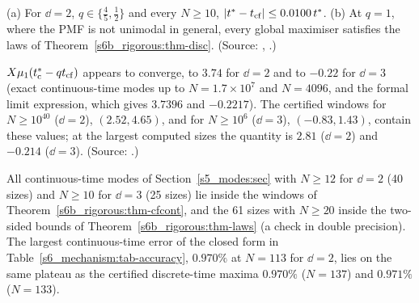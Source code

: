 \begin{conjecture}\label{s6b_rigorous:conj-cf}
(a) For $\dd=2$, $q\in\{\frac45,\frac12\}$ and every $N\ge10$, $|t^{*}-t_{\mathrm{cf}}|\le0.0100\,t^{*}$. (b) At $q=1$,
where the PMF is not unimodal in general, every global maximiser satisfies the laws of
Theorem~\ref{s6b_rigorous:thm-disc}.
\textup{(Source: , .)}
\end{conjecture}

\begin{observation}\label{s6b_rigorous:obs-Kinf}
$X\mu_{1}(t^{*}_{\mathrm{c}}-qt_{\mathrm{cf}})$ appears to converge, to $3.74$ for $\dd=2$ and to $-0.22$ for $\dd=3$ (exact continuous-time
modes up to $N=1.7\times10^{7}$ and $N=4096$, and the formal limit expression, which gives $3.7396$ and $-0.2217$). The
certified windows for $N\ge10^{40}$ ($\dd=2$), $(2.52,4.65)$, and for $N\ge10^{6}$ ($\dd=3$), $(-0.83,1.43)$, contain these
values; at the largest computed sizes the quantity is $2.81$ ($\dd=2$) and $-0.214$ ($\dd=3$).
\textup{(Source: .)}
\end{observation}

All continuous-time modes of Section~\ref{s5_modes:sec} with $N\ge12$ for $\dd=2$ (40 sizes) and $N\ge10$ for $\dd=3$ (25
sizes) lie inside the windows of Theorem~\ref{s6b_rigorous:thm-cfcont}, and the 61 sizes with $N\ge20$ inside the
two-sided bounds of Theorem~\ref{s6b_rigorous:thm-laws} (a check in double precision). The largest continuous-time error
of the closed form in Table~\ref{s6_mechanism:tab-accuracy}, $0.970\%$ at $N=113$ for $\dd=2$, lies on the same plateau as
the certified discrete-time maxima $0.970\%$ ($N=137$) and $0.971\%$ ($N=133$).

